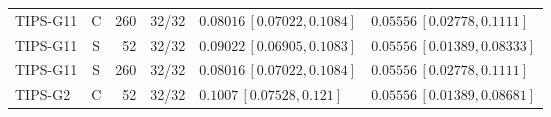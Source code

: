 \documentclass[10pt,a4paper]{article}
\begin{document}
\begin{longtable}{lcrcp{44mm}p{44mm}}
TIPS-G11 & C & 260 & 32/32 & \(0.08016\,[0.07022,0.1084]\) & \(0.05556\,[0.02778,0.1111]\)\\
TIPS-G11 & S & 52 & 32/32 & \(0.09022\,[0.06905,0.1083]\) & \(0.05556\,[0.01389,0.08333]\)\\
TIPS-G11 & S & 260 & 32/32 & \(0.08016\,[0.07022,0.1084]\) & \(0.05556\,[0.02778,0.1111]\)\\
TIPS-G2 & C & 52 & 32/32 & \(0.1007\,[0.07528,0.121]\) & \(0.05556\,[0.01389,0.08681]\)\\

\end{longtable}
\end{document}
